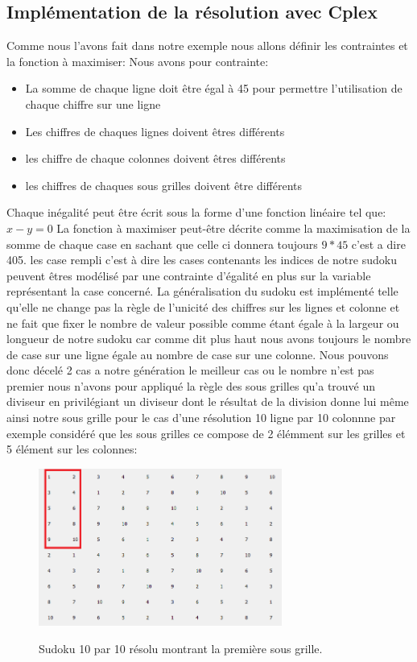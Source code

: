 \subsection{Implémentation de la résolution avec Cplex}

Comme nous l'avons fait dans notre exemple nous allons définir les contraintes et la fonction à maximiser:
Nous avons pour contrainte:
\begin{itemize}
\item La somme de chaque ligne doit être égal à 45 pour permettre l'utilisation de chaque chiffre sur une ligne
\item Les chiffres de chaques lignes doivent êtres différents
\item les chiffre de chaque colonnes doivent êtres différents
\item les chiffres de chaques sous grilles doivent être différents
\end{itemize}

Chaque inégalité peut être écrit sous la forme d'une fonction linéaire tel que:
\newline
$x-y=0$
\newline
La fonction à maximiser peut-être décrite comme la maximisation de la somme de chaque case en sachant que celle ci donnera toujours $9*45$ c'est a dire 405.
\newline
les case rempli c'est à dire les cases contenants les indices de notre sudoku peuvent êtres modélisé par une contrainte d'égalité en plus sur la variable représentant la case concerné.\newline
La généralisation du sudoku est implémenté telle qu'elle ne change pas la règle de l'unicité des chiffres sur les lignes et colonne et ne fait que fixer le nombre de valeur possible comme étant égale à la largeur ou longueur de notre sudoku car comme dit plus haut nous avons toujours le nombre de case sur une ligne égale au nombre de case sur une colonne. Nous pouvons donc décelé 2 cas a notre génération le meilleur cas ou le nombre n'est pas premier nous n'avons pour appliqué la règle des sous grilles qu'a trouvé un diviseur en privilégiant un diviseur dont le résultat de la division donne lui même ainsi notre sous grille pour le cas d'une résolution 10 ligne par 10 colonnne par exemple considéré que les sous grilles ce compose de 2 élémment sur les grilles et 5 élément sur les colonnes:

\begin{figure}[h]
  \begin{center}
\includegraphics[width=8cm]{./images/10_10.png}\label{10_10}
\caption{Sudoku 10 par 10 résolu montrant la première sous grille.}
\end{center}
\end{figure}

